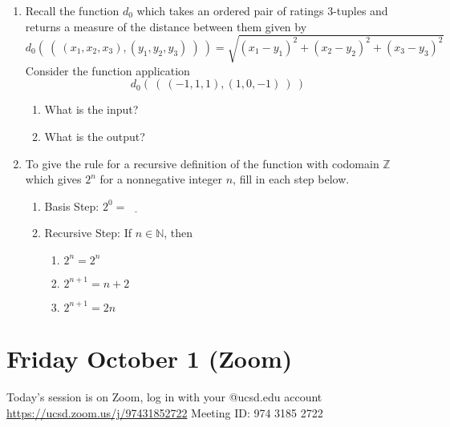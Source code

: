 \documentclass[12pt, oneside]{article}
\newcommand{\A}[0]{\texttt{A}}
\newcommand{\C}[0]{\texttt{C}}
\newcommand{\U}[0]{\texttt{U}}
\begin{document}
\begin{enumerate}
{\begin{enumerate}
\item {\bf True} or {\bf False}: There is an example of an RNA strand that is both in the set obtained as the result
of the set-wise concatenation $\{ \A\A, \A\C \} \circ \{\U, \A\A \}$ and in the set obtained as the result of the 
Cartesian product $\{ \A\A, \A\C \} \times \{\U\A, \A\A \}$

\end{enumerate}
{\it Bonus - not for credit: Describe each of the sets above using roster method.}
 }
    \item {

Recall the function
$d_0$ which takes an ordered pair of ratings $3$-tuples and returns a measure
of the distance between them 
given by
\[
d_0 (~(~ (x_1, x_2, x_3), (y_1, y_2, y_3) ~) ~) = \sqrt{ (x_1 - y_1)^2 + (x_2 - y_2)^2 + (x_3 -y_3)^2}
\]
Consider the function application 
\[
  d_0 (~( ~(-1,1,1), (1, 0, -1)~) ~)
\]
\begin{enumerate}
    \item What is the input? 
    \item What is the output?
\end{enumerate} }
    \item {

To give the rule for a recursive definition of the function with codomain
$\mathbb{Z}$ which gives $2^n$ for a nonnegative integer $n$,
fill in each step below.
\begin{enumerate}
\item Basis Step: $2^0 = \underline{\phantom{1in}}$
\item Recursive Step: If $n \in \mathbb{N}$, then 
    \begin{enumerate}
        \item $2^{n} = 2^{n}$
        \item $2^{n+1} = n+2$
        \item $2^{n+1} = 2n$
    \end{enumerate}
\end{enumerate}

 }
\end{enumerate}
\newpage
\section*{Friday October 1 (Zoom)}

Today's session is on Zoom, log in with your @ucsd.edu account \url{https://ucsd.zoom.us/j/97431852722} Meeting ID: 974 3185 2722
\end{document}
